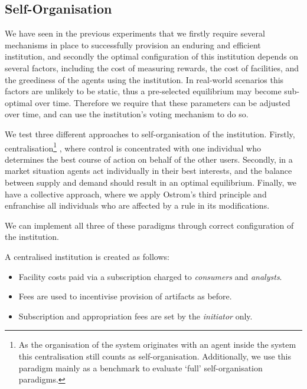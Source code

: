 

\subsection{Self-Organisation}

We have seen in the previous experiments that we firstly require several
mechanisms in place to successfully provision an enduring and efficient
institution, and secondly the optimal configuration of this institution
depends on several factors, including the cost of measuring rewards, the cost
of facilities, and the greediness of the agents using the institution.
In real-world scenarios this factors are unlikely to be static, thus a 
pre-selected equilibrium may become sub-optimal over time. Therefore we require
that these parameters can be adjusted over time, and can use the institution's
voting mechanism to do so.

We test three different approaches to self-organisation of the institution.
Firstly, centralisation\footnote{As the organisation of the system originates with an agent inside the system this centralisation still counts as self-organisation. Additionally, we use this paradigm mainly as a benchmark to evaluate `full' self-organisation paradigms.}
, where control is concentrated with one individual who
determines the best course of action on behalf of the other users. Secondly,
in a market situation agents act individually in their best interests, and the
balance between supply and demand should result in an optimal equilibrium.
Finally, we have a collective approach, where we apply Ostrom's third principle and enfranchise all individuals who
are affected by a rule in its modifications.

We can implement all three of these paradigms through correct configuration of the institution. 

A centralised institution is created as follows:

\begin{itemize}
\item Facility costs paid via a subscription charged to \emph{consumers} and \emph{analysts}.
\item Fees are used to incentivise provision of artifacts as before.
\item Subscription and appropriation fees are set by the \emph{initiator} only.
\end{itemize}

